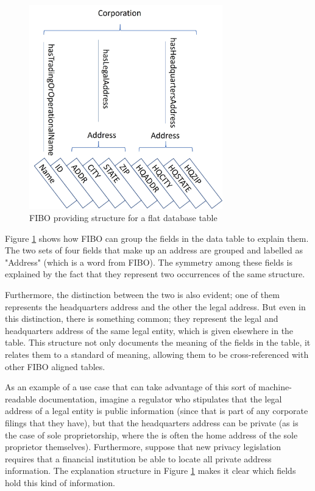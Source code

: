 \begin{figure}[hbt] %
\centering
  \includegraphics[width=3.3in]{figures/data-table.jpg}
\caption{FIBO providing structure for a flat database table }
\label{ch01.fig2} 
\end{figure}


Figure \ref{ch01.fig2} shows how FIBO can group the fields in the data table to explain them.  The two sets of four fields that make up an address are grouped and labelled as "Address" (which is a word from FIBO).  The symmetry among these fields is explained by the fact that they represent two occurrences of the same structure. 

Furthermore, the distinction between the two is also evident; one of them represents the headquarters address and the other the legal address.  But even in this distinction, there is something common; they represent the legal and headquarters address of the same legal entity, which is given elsewhere in the table.  This structure not only documents the meaning of the fields in the table, it relates them to a standard of meaning, allowing them to be cross-referenced with other FIBO aligned tables. 

As an example of a use case that can take advantage of this sort of machine-readable documentation, imagine a regulator who stipulates that the legal address of a legal entity is public information (since that is part of any corporate filings that they have), but that the headquarters address can be private (as is the case of sole proprietorship, where the  is often the home address of the sole proprietor themselves).  Furthermore, suppose that new privacy legislation requires that a financial institution be able to locate all private address information.   The explanation structure in Figure \ref{ch01.fig2} makes it clear which fields hold this kind of information. 

